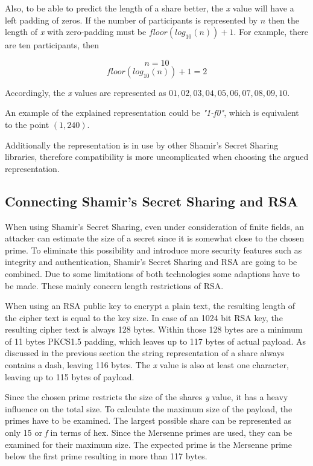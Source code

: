 Also, to be able to predict the length of a share better, the \textit{x} value
will have a left padding of zeros. If the number of participants is represented
by $n$ then the length of \textit{x} with zero-padding must be
$floor(log_{10}(n))+1$. For example, there are ten participants, then

$$n = 10$$
$$floor(log_{10}(n))+1 = 2$$

Accordingly, the \textit{x} values are represented as $01, 02, 03, 04, 05, 06,
07, 08, 09, 10$.

An example of the explained representation could be \textit{"1-f0"}, which is
equivalent to the point $(1, 240)$.

Additionally the representation is in use by other Shamir's Secret Sharing
libraries, therefore compatibility is more uncomplicated when choosing the
argued representation.

\subsection{Connecting Shamir's Secret Sharing and RSA}

When using Shamir's Secret Sharing, even under consideration of finite fields,
an attacker can estimate the size of a secret since it is somewhat close to the
chosen prime. To eliminate this possibility and introduce more security
features such as integrity and authentication, Shamir's Secret Sharing and RSA
are going to be combined. Due to some limitations of both technologies some
adaptions have to be made. These mainly concern length restrictions of RSA.

When using an RSA public key to encrypt a plain text, the resulting length of
the cipher text is equal to the key size. In case of an 1024 bit RSA key, the
resulting cipher text is always 128 bytes. Within those 128 bytes are a minimum
of 11 bytes PKCS1.5 padding, which leaves up to 117 bytes of actual payload. As
discussed in the previous section the string representation of a share always
contains a dash, leaving 116 bytes. The \textit{x} value is also at least one
character, leaving up to 115 bytes of payload.

Since the chosen prime restricts the size of the shares \textit{y} value, it
has a heavy influence on the total size. To calculate the maximum size of the
payload, the primes have to be examined. The largest possible share can be
represented as only 15 or \textit{f} in terms of hex. Since the Mersenne primes
are used, they can be examined for their maximum size. The expected prime is
the Mersenne prime below the first prime resulting in more than 117 bytes.

